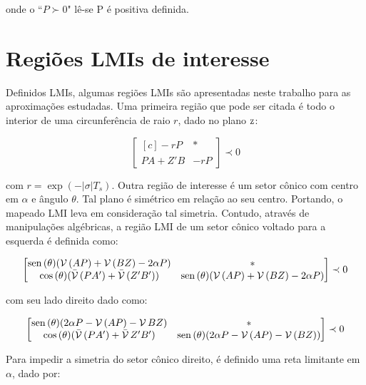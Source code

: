 \noindent onde o ``$P \succ 0$" lê-se P é positiva definida.

\section{Regiões LMIs de interesse}
Definidos LMIs, algumas regiões LMIs são apresentadas neste trabalho para as aproximações estudadas. Uma primeira região que pode ser citada é todo o interior de uma circunferência de raio $r$, dado no plano $\operatorname{\mathrm{z}}$:

\begin{equation}
  \begin{bmatrix*}[c]
    -rP       & * \\
    PA + Z'B  & -rP
  \end{bmatrix*}
  \prec 0\label{eq:LMIEstabilidadeRelativa}
\end{equation}

\noindent com $r = \exp{\left(-|\sigma|T_s\right)}$. Outra região de interesse é um setor cônico com centro em $\alpha$ e ângulo $\theta$. Tal plano é simétrico em relação ao seu centro. Portando, o mapeado LMI leva em consideração tal simetria. Contudo, através de manipulações algébricas, a região LMI de um setor cônico voltado para a esquerda é definida como:

\begin{equation}
  \begin{bmatrix*}[c]
    \sen{(\theta)(\Herm{(AP)} + \Herm{(BZ)} -2\alpha P)} &  * \\
    \cos{(\theta)(\herm{(PA')} + \herm{(Z'B')})}      &  \sen{(\theta)(\Herm{(AP)} + \Herm{(BZ)} -2\alpha P)}
  \end{bmatrix*}
  \prec 0\label{eq:LMIESetorConicoEsquerdo}
\end{equation}

\noindent com seu lado direito dado como:

\begin{equation}
  \begin{bmatrix*}[c]
    \sen{(\theta)(2\alpha P - \Herm{(AP)} - \Herm{BZ})} & * \\
    \cos{(\theta)(\herm{(PA')} + \herm{Z'B'})}       & \sen{(\theta)(2\alpha P - \Herm{(AP)} - \Herm{(BZ)})}
  \end{bmatrix*}
  \prec 0\label{eq:LMIESetorConicoDireito}
\end{equation}

Para impedir a simetria do setor cônico direito, é definido uma reta limitante em $\alpha$, dado por:

